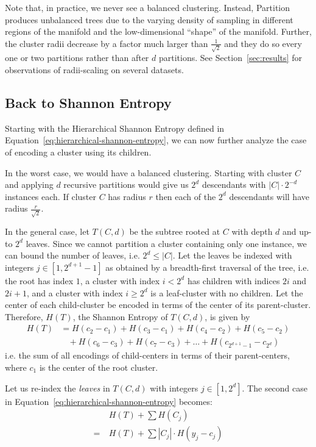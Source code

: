 Note that, in practice, we never see a balanced clustering.
Instead, Partition produces unbalanced trees due to the varying density of sampling in different regions of the manifold and the low-dimensional ``shape'' of the manifold.
Further, the cluster radii decrease by a factor much larger than $\frac{1}{\sqrt{2}}$ and they do so every one or two partitions rather than after $d$ partitions.
See Section~\ref{sec:results} for observations of radii-scaling on several datasets.


\subsection{Back to Shannon Entropy}
\label{subsec:methods:back-to-shannon-entropy}

Starting with the Hierarchical Shannon Entropy defined in Equation~\ref{eq:hierarchical-shannon-entropy}, we can now further analyze the case of encoding a cluster using its children.

In the worst case, we would have a balanced clustering.
Starting with cluster $C$ and applying $d$ recursive partitions would give us $2^d$ descendants with $|C| \cdot 2^{-d}$ instances each.
If cluster $C$ has radius $r$ then each of the $2^d$ descendants will have radius $\frac{r}{\sqrt{2}}$.

In the general case, let $T(C, d)$ be the subtree rooted at $C$ with depth $d$ and up-to $2^d$ leaves.
Since we cannot partition a cluster containing only one instance, we can bound the number of leaves, i.e. $2^d \leq |C|$.
Let the leaves be indexed with integers $j \in [1, 2^{d + 1} - 1]$ as obtained by a breadth-first traversal of the tree, i.e. the root has index $1$, a cluster with index $i < 2^d$ has children with indices $2i$ and $2i + 1$, and a cluster with index $i \geq 2^d$ is a leaf-cluster with no children.
Let the center of each child-cluster be encoded in terms of the center of its parent-cluster.
Therefore, $H(T)$, the Shannon Entropy of $T(C, d)$, is given by
\begin{align*}
    H(T) &= H(c_2 - c_1) + H(c_3 - c_1) + H(c_4 - c_2) + H(c_5 - c_2) \\
    & \ \ \ \ + H(c_6 - c_3) + H(c_7 - c_3) + \dots + H(c_{2^{d + 1} - 1} - c_{2^d})
\end{align*}
i.e. the sum of all encodings of child-centers in terms of their parent-centers, where $c_1$ is the center of the root cluster.

Let us re-index the \textit{leaves} in $T(C, d)$ with integers $j \in [1, 2^d]$.
The second case in Equation~\ref{eq:hierarchical-shannon-entropy} becomes:
\begin{align*}
    & H(T) + \sum H(C_j) \\
    = \ & H(T) + \sum |C_j| \cdot H(y_j - c_j)
\end{align*}

